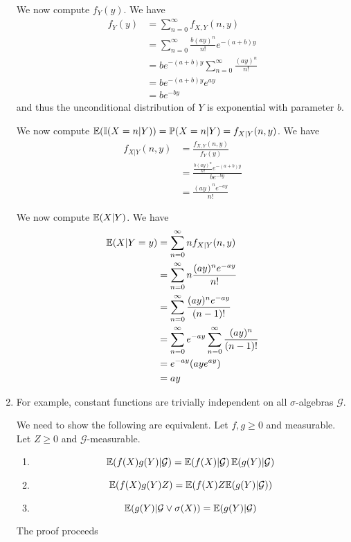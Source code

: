 \begin{enumerate}
  We now compute $f_{Y}(y)$. We have
  \begin{align}
    \label{eq:15}
    f_{Y}(y) &= \sum_{n=0}^{\infty} f_{X, Y}(n, y) \\
    &= \sum_{n=0}^{\infty} \frac{b(ay)^{n}}{n!} e^{-(a+b)y} \\
    &= b e^{-(a+b)y} \sum_{n=0}^{\infty} \frac{(ay)^{n}}{n!} \\
    &= b e^{-(a+b)y} e^{ay} \\
    &= be^{-by}
  \end{align}
  and thus the unconditional distribution of $Y$ is exponential with
  parameter $b$.

  We now compute $\E{\I{X=n|Y}} = \Prob{X=n|Y} = f_{X|Y}(n, y)$. We have
  \begin{align}
    \label{eq:13}
    f_{X|Y}(n, y) &= \frac{f_{X,Y}(n, y)}{f_{Y}(y)} \\
    &= \frac{\frac{b(ay)^{n}}{n!} e^{-(a+b)y}}{be^{-by}} \\
    &= \frac{(ay)^{n}e^{-ay}}{n!}
  \end{align}

  We now compute $\E{X|Y}$.  We have
  \begin{align}
    \label{eq:14}
    \E{X|Y=y} &= \sum_{n=0}^{\infty} n f_{X|Y}(n, y) \\
    &= \sum_{n=0}^{\infty} n  \frac{(ay)^{n} e^{-ay}}{n!} \\
    &= \sum_{n=0}^{\infty} \frac{(ay)^{n} e^{-ay}}{(n-1)!} \\
    &= \sum_{n=0}^{\infty} e^{-ay} \sum_{n=0}^{\infty}
    \frac{(ay)^{n}}{(n-1)!} \\
    &= e^{-ay} (ay e^{ay}) \\
    &= ay
  \end{align}
\item For example, constant functions are trivially independent on all
  $\sigma$-algebras $\mathcal{G}$.

  We need to show the following are equivalent.  Let $f, g \geq 0$ and
  measurable.  Let $Z \geq 0$ and $\mathcal{G}$-measurable.  
  \begin{enumerate}
  \item \label{item:1}
    \begin{equation}
      \label{eq:17}
      \E{f(X) g(Y) | \mathcal{G}} = \E{f(X) | \mathcal{G}} \E{g(Y) | \mathcal{G}}
    \end{equation}
  \item \label{item:2}
    \begin{equation}
      \label{eq:18}
      \E{f(X) g(Y) Z} = \E{f(X) Z \E{g(Y) | \mathcal{G}}} 
    \end{equation}
  \item \label{item:3}
    \begin{equation}
      \label{eq:19}
      \E{g(Y) | \mathcal{G} \vee \sigma(X)} = \E{g(Y) | \mathcal{G}}
    \end{equation}
  \end{enumerate}

  The proof proceeds
\end{enumerate}

